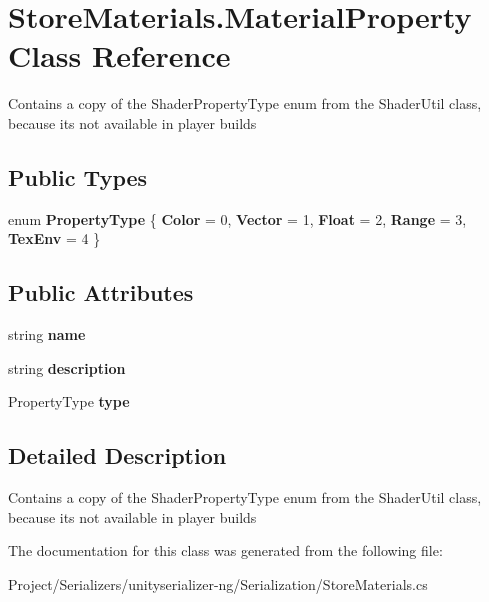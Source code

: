 \hypertarget{class_store_materials_1_1_material_property}{}\section{Store\+Materials.\+Material\+Property Class Reference}
\label{class_store_materials_1_1_material_property}


Contains a copy of the Shader\+Property\+Type enum from the Shader\+Util class, because it\textquotesingle{}s not available in player builds  


\subsection*{Public Types}
\begin{DoxyCompactItemize}
\item 
\mbox{\label{class_store_materials_1_1_material_property_adbe3c0a0623fde81b7b5313b858cb5f3}} 
enum {\bfseries Property\+Type} \{ \newline
{\bfseries Color} = 0, 
{\bfseries Vector} = 1, 
{\bfseries Float} = 2, 
{\bfseries Range} = 3, 
\newline
{\bfseries Tex\+Env} = 4
 \}
\end{DoxyCompactItemize}
\subsection*{Public Attributes}
\begin{DoxyCompactItemize}
\item 
\mbox{\label{class_store_materials_1_1_material_property_af68e609bec2faf0611788c03048459b7}} 
string {\bfseries name}
\item 
\mbox{\label{class_store_materials_1_1_material_property_af4c0d8383ef4d47df5a9b854be619467}} 
string {\bfseries description}
\item 
\mbox{\label{class_store_materials_1_1_material_property_ad3504e2e7b2c2fa03baa8dc36e6a8891}} 
Property\+Type {\bfseries type}
\end{DoxyCompactItemize}


\subsection{Detailed Description}
Contains a copy of the Shader\+Property\+Type enum from the Shader\+Util class, because it\textquotesingle{}s not available in player builds 



The documentation for this class was generated from the following file\+:\begin{DoxyCompactItemize}
\item 
Project/\+Serializers/unityserializer-\/ng/\+Serialization/Store\+Materials.\+cs\end{DoxyCompactItemize}
